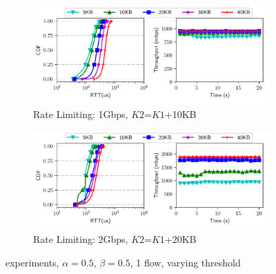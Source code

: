 \begin{figure}[!t]
\centering
\begin{subfigure}[b]{0.45\textwidth}
\centering
\includegraphics[width=\textwidth]{rate_limiter/raw_data/spring_benchmark/1gbps.pdf}
\caption{Rate Limiting: 1Gbps, $K2$=$K1$+10KB}
\label{fig:spring-1g} 
\end{subfigure}
\begin{subfigure}[b]{0.45\textwidth}
\centering
\includegraphics[width=\textwidth]{rate_limiter/raw_data/spring_benchmark/2gbps.pdf}
\caption{Rate Limiting: 2Gbps, $K2$=$K1$+20KB}
\label{fig:spring-2g} 
\end{subfigure}
\caption{\nametwo experiments, $\alpha=0.5$, $\beta=0.5$, 1 flow, varying threshold}
\label{fig:spring} 
\end{figure}

